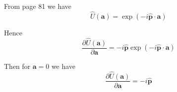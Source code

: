 


\bigskip
From page 81 we have
\begin{equation*}
\hat U(\mathbf a)=\exp(-i\hat{\mathbf p}\cdot\mathbf a)
\end{equation*}

Hence
\begin{equation*}
\frac{\partial\hat U(\mathbf a)}{\partial\mathbf a}=-i\hat{\mathbf p}\exp(-i\hat{\mathbf p}\cdot\mathbf a)
\end{equation*}

Then for $\mathbf a=0$ we have
\begin{equation*}
\frac{\partial\hat U(\mathbf a)}{\partial\mathbf a}=-i\hat{\mathbf p}
\end{equation*}


